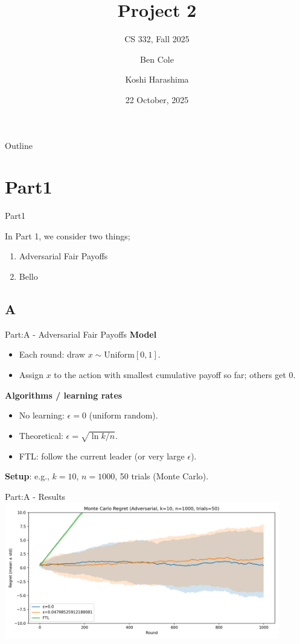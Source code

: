 \documentclass{beamer}
\title[Project 2]{Project 2}
\subtitle{CS 332, Fall 2025}
\author{Ben Cole \and Koshi Harashima}
\date{22 October, 2025}
\begin{document}
\maketitle

\begin{frame}{Outline}
  \tableofcontents
\end{frame}

\section{Part1}
\begin{frame}{Part1}

In Part 1, we consider two things;
\begin{enumerate}
    \item Adversarial Fair Payoffs
    \item Bello
\end{enumerate}
\end{frame}

\subsection{A}
\begin{frame}{Part:A - Adversarial Fair Payoffs}
\textbf{Model}
\begin{itemize}
  \item Each round: draw \(x \sim \mathrm{Uniform}[0,1]\).
  \item Assign \(x\) to the action with smallest cumulative payoff so far; others get 0.
\end{itemize}
\textbf{Algorithms / learning rates}
\begin{itemize}
  \item No learning: \(\epsilon = 0\) (uniform random).
  \item Theoretical: \(\epsilon = \sqrt{\ln k / n}\).
  \item FTL: follow the current leader (or very large \(\epsilon\)).
\end{itemize}
\textbf{Setup}: e.g., \(k=10\), \(n=1000\), 50 trials (Monte Carlo).
\end{frame}

\begin{frame}{Part:A - Results}
\includegraphics[width=0.9\textwidth]{figures/adv_mc_regret.png}

\end{frame}
\end{document}
